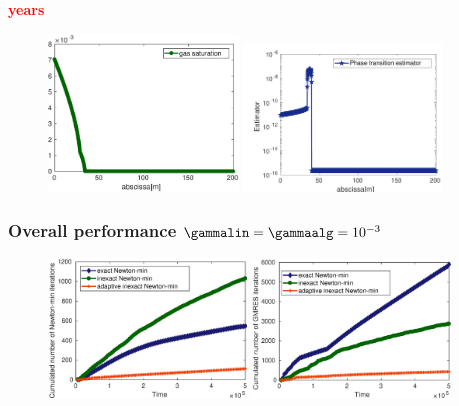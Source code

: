 \begin{frame}
\begin{overprint}
\scriptsize{ \textbf{\textcolor{red}{  years}}}
\begin{figure}
\includegraphics[width=0.45\textwidth]{fig_article_chap_3/satur_gas_after_appearance.eps}
\quad
\includegraphics[width=0.47\textwidth]{fig_article_chap_3/MODIF_phase_transition_estimator_appearance_gas_nt=9_cv}
\end{figure}
\end{overprint}
 \end{frame}
%
\begin{frame}
\frametitle{Overall performance $\gammalin = \gammaalg = 10^{-3}$}
\begin{figure}
\centering
\includegraphics[width=0.47\textwidth]{fig_article_chap_3/Cumulated_number_Newton_iterations_three_methods_Nx_1000}
\hspace{0.6 cm}
\includegraphics[width=0.47\textwidth]{fig_article_chap_3/Cumulated_number_gmres_iterations_three_methods_Nx_1000}
\end{figure}
\end{frame}
